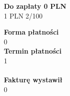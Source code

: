 \documentclass[a4paper,10pt]{article}
\begin{document}
  \noindent
  \begin{flushright}
  \textbf{\LARGE{Do zapłaty} {0} PLN}\\
  {1} PLN {2}/100
  \end{flushright}

  \vfill
  \noindent
  \textbf{Forma płatności}\\
  {0}\\
  \textbf{Termin płatności}\\
  {1}\\
  \\
  
    \textbf{Fakturę wystawił}\\
    {0}
    
\end{document}
